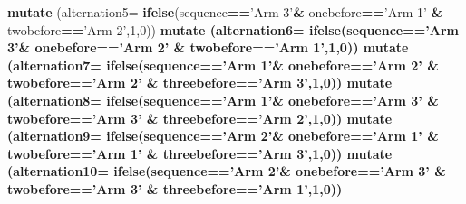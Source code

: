 \documentclass[]{article}
\newenvironment{Shaded}{\begin{snugshade}}{\end{snugshade}}
\newcommand{\DataTypeTok}[1]{\textcolor[rgb]{0.13,0.29,0.53}{#1}}
\newcommand{\DecValTok}[1]{\textcolor[rgb]{0.00,0.00,0.81}{#1}}
\newcommand{\KeywordTok}[1]{\textcolor[rgb]{0.13,0.29,0.53}{\textbf{#1}}}
\newcommand{\NormalTok}[1]{#1}
\newcommand{\OperatorTok}[1]{\textcolor[rgb]{0.81,0.36,0.00}{\textbf{#1}}}
\newcommand{\StringTok}[1]{\textcolor[rgb]{0.31,0.60,0.02}{#1}}
\begin{document}
\begin{Shaded}
\begin{Highlighting}[]
{{{{{{\StringTok{    }\KeywordTok{mutate}\NormalTok{ (}\DataTypeTok{alternation5=} \KeywordTok{ifelse}\NormalTok{(sequence}\OperatorTok{==}\StringTok{'Arm 3'}\OperatorTok{&}\StringTok{ }\NormalTok{onebefore}\OperatorTok{==}\StringTok{'Arm 1'} \OperatorTok{&}\StringTok{ }\NormalTok{twobefore}\OperatorTok{==}\StringTok{'Arm 2'}\NormalTok{,}\DecValTok{1}\NormalTok{,}\DecValTok{0}\NormalTok{)) }\OperatorTok{%>%}\StringTok{ }
\StringTok{    }\KeywordTok{mutate}\NormalTok{ (}\DataTypeTok{alternation6=} \KeywordTok{ifelse}\NormalTok{(sequence}\OperatorTok{==}\StringTok{'Arm 3'}\OperatorTok{&}\StringTok{ }\NormalTok{onebefore}\OperatorTok{==}\StringTok{'Arm 2'} \OperatorTok{&}\StringTok{ }\NormalTok{twobefore}\OperatorTok{==}\StringTok{'Arm 1'}\NormalTok{,}\DecValTok{1}\NormalTok{,}\DecValTok{0}\NormalTok{)) }\OperatorTok{%>%}\StringTok{ }
\StringTok{    }\KeywordTok{mutate}\NormalTok{ (}\DataTypeTok{alternation7=} \KeywordTok{ifelse}\NormalTok{(sequence}\OperatorTok{==}\StringTok{'Arm 1'}\OperatorTok{&}\StringTok{ }\NormalTok{onebefore}\OperatorTok{==}\StringTok{'Arm 2'} \OperatorTok{&}\StringTok{ }\NormalTok{twobefore}\OperatorTok{==}\StringTok{'Arm 2'} \OperatorTok{&}\StringTok{ }\NormalTok{threebefore}\OperatorTok{==}\StringTok{'Arm 3'}\NormalTok{,}\DecValTok{1}\NormalTok{,}\DecValTok{0}\NormalTok{)) }\OperatorTok{%>%}\StringTok{ }
\StringTok{    }\KeywordTok{mutate}\NormalTok{ (}\DataTypeTok{alternation8=} \KeywordTok{ifelse}\NormalTok{(sequence}\OperatorTok{==}\StringTok{'Arm 1'}\OperatorTok{&}\StringTok{ }\NormalTok{onebefore}\OperatorTok{==}\StringTok{'Arm 3'} \OperatorTok{&}\StringTok{ }\NormalTok{twobefore}\OperatorTok{==}\StringTok{'Arm 3'} \OperatorTok{&}\StringTok{ }\NormalTok{threebefore}\OperatorTok{==}\StringTok{'Arm 2'}\NormalTok{,}\DecValTok{1}\NormalTok{,}\DecValTok{0}\NormalTok{)) }\OperatorTok{%>%}\StringTok{ }
\StringTok{    }\KeywordTok{mutate}\NormalTok{ (}\DataTypeTok{alternation9=} \KeywordTok{ifelse}\NormalTok{(sequence}\OperatorTok{==}\StringTok{'Arm 2'}\OperatorTok{&}\StringTok{ }\NormalTok{onebefore}\OperatorTok{==}\StringTok{'Arm 1'} \OperatorTok{&}\StringTok{ }\NormalTok{twobefore}\OperatorTok{==}\StringTok{'Arm 1'} \OperatorTok{&}\StringTok{ }\NormalTok{threebefore}\OperatorTok{==}\StringTok{'Arm 3'}\NormalTok{,}\DecValTok{1}\NormalTok{,}\DecValTok{0}\NormalTok{)) }\OperatorTok{%>%}\StringTok{ }
\StringTok{    }\KeywordTok{mutate}\NormalTok{ (}\DataTypeTok{alternation10=} \KeywordTok{ifelse}\NormalTok{(sequence}\OperatorTok{==}\StringTok{'Arm 2'}\OperatorTok{&}\StringTok{ }\NormalTok{onebefore}\OperatorTok{==}\StringTok{'Arm 3'} \OperatorTok{&}\StringTok{ }\NormalTok{twobefore}\OperatorTok{==}\StringTok{'Arm 3'} \OperatorTok{&}\StringTok{ }\NormalTok{threebefore}\OperatorTok{==}\StringTok{'Arm 1'}\NormalTok{,}\DecValTok{1}\NormalTok{,}\DecValTok{0}\NormalTok{)) }\OperatorTok{%>%}\StringTok{ }
}}}}}}}}}}}}
\end{Highlighting}
\end{Shaded}
\end{document}
